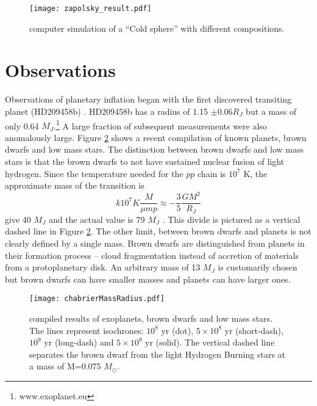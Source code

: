\documentclass[twocolumn]{emulateapj}
\begin{document}
\begin{figure}[!htbp]
\begin{center}
\vspace{0.2in}
\texttt{[image: zapolsky\_result.pdf]}
\caption{\citet{zapolsky} computer simulation of a ``Cold sphere'' with different compositions.}
\label{zapolfig}
\end{center}
\end{figure}

\section{Observations}
Observations of planetary inflation began with the first discovered transiting planet (HD209458b) \citep{charb,henry2000}. HD209458b has a radius of 1.15 $\pm 0.06 R_J$ but a mass of only 0.64 $M_J$.\footnote{www.exoplanet.eu} A large fraction of subsequent measurements were also anomalously large. Figure \ref{chabrierfig} shows a recent compilation of known planets, brown dwarfs and low mass stars. The distinction between brown dwarfs and low mass stars is that the brown dwarfs to not have sustained nuclear fusion of light hydrogen. Since the temperature needed for the $pp$ chain is $10^7$ K, the approximate mass of the transition is
\begin{equation}
k 10^7 K \frac{M}{\mu mp} \approx -\frac{3}{5} \frac{G M^2}{R_J}
\end{equation}
give 40 $M_J$ and the actual value is 79 $M_J$ \citep{chabrier2010}. This divide is pictured as a vertical dashed line in Figure \ref{chabrierfig}. The other limit, between brown dwarfs and planets is not clearly defined by a single mass. Brown dwarfs are distinguished from planets in their formation process -- cloud fragmentation instead of accretion of materials from a protoplanetary disk. An arbitrary mass of 13 $M_J$ is customarily chosen but brown dwarfs can have smaller masses and planets can have larger ones.

\begin{figure}[!htbp]
\begin{center}
\texttt{[image: chabrierMassRadius.pdf]}
\caption{\citet{chabrier2010} compiled results of exoplanets, brown dwarfs and low mass stars. The lines represent isochrones: $10^8$ yr (dot), $5 \times 10^8$ yr (short-dash), $10^9$ yr (long-dash) and $5 \times 10^9$ yr (solid). The vertical dashed line separates the brown dwarf from the light Hydrogen Burning stars at a mass of M=0.075 $M_\odot$.}
\label{chabrierfig}
\end{center}
\end{figure}
\end{document}
